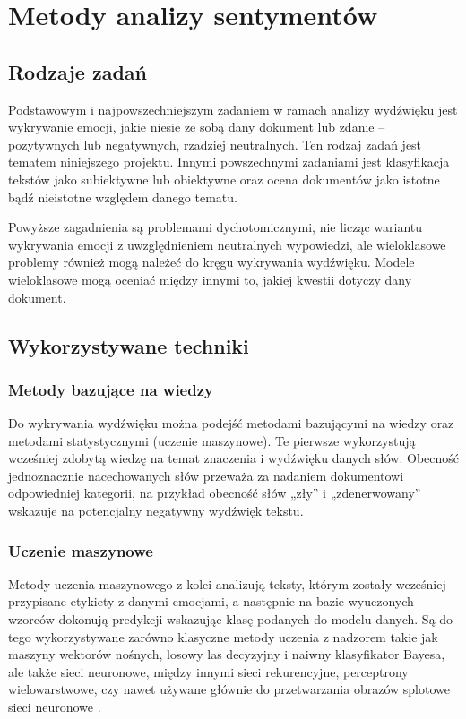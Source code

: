 \newpage
\section{Metody analizy sentymentów}
\subsection{Rodzaje zadań}
Podstawowym i najpowszechniejszym zadaniem w ramach analizy wydźwięku jest wykrywanie emocji, jakie niesie ze sobą dany dokument lub zdanie -- pozytywnych lub negatywnych, rzadziej neutralnych. Ten rodzaj
zadań jest tematem niniejszego projektu.
Innymi powszechnymi zadaniami jest klasyfikacja tekstów jako subiektywne lub obiektywne oraz
ocena dokumentów jako istotne bądź nieistotne względem danego tematu.

Powyższe zagadnienia są problemami dychotomicznymi, nie licząc wariantu wykrywania emocji
z uwzględnieniem neutralnych wypowiedzi, ale wieloklasowe problemy również mogą należeć
do kręgu wykrywania wydźwięku. Modele wieloklasowe mogą oceniać między innymi to, jakiej
kwestii dotyczy dany dokument.

\subsection{Wykorzystywane techniki}
\subsubsection{Metody bazujące na wiedzy}
Do wykrywania wydźwięku można podejść metodami bazującymi na wiedzy oraz metodami statystycznymi (uczenie maszynowe).
Te pierwsze wykorzystują wcześniej zdobytą wiedzę na temat znaczenia i wydźwięku danych słów.
Obecność jednoznacznie nacechowanych słów przeważa za nadaniem dokumentowi odpowiedniej
kategorii, na przykład obecność słów „zły” i „zdenerwowany” wskazuje na potencjalny
negatywny wydźwięk tekstu.

\subsubsection{Uczenie maszynowe}
Metody uczenia maszynowego z kolei analizują teksty, którym zostały wcześniej przypisane etykiety
z danymi emocjami, a następnie na bazie wyuczonych wzorców dokonują predykcji wskazując
klasę podanych do modelu danych. Są do tego wykorzystywane zarówno klasyczne metody
uczenia z nadzorem takie jak maszyny wektorów nośnych, losowy las decyzyjny i naiwny 
klasyfikator Bayesa, ale także sieci neuronowe, między innymi sieci rekurencyjne,
perceptrony wielowarstwowe, czy nawet używane głównie do przetwarzania obrazów splotowe
sieci neuronowe \cite{kim2014}.

